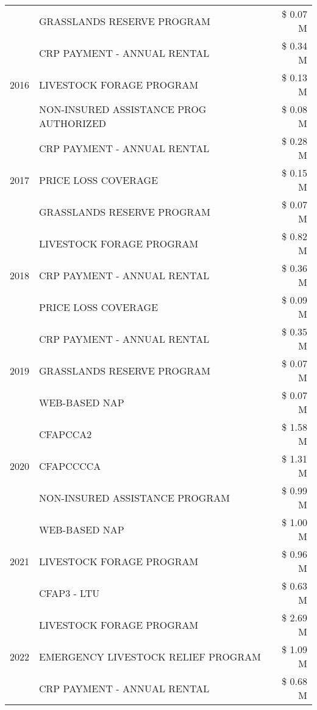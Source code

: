 \begin{tabular}{llr}
 & GRASSLANDS RESERVE PROGRAM & \$ 0.07 M \\
\cline{1-3}
\multirow[t]{3}{*}{2016} & CRP PAYMENT - ANNUAL RENTAL & \$ 0.34 M \\
 & LIVESTOCK FORAGE PROGRAM & \$ 0.13 M \\
 & NON-INSURED ASSISTANCE PROG AUTHORIZED & \$ 0.08 M \\
\cline{1-3}
\multirow[t]{3}{*}{2017} & CRP PAYMENT - ANNUAL RENTAL & \$ 0.28 M \\
 & PRICE LOSS COVERAGE & \$ 0.15 M \\
 & GRASSLANDS RESERVE PROGRAM & \$ 0.07 M \\
\cline{1-3}
\multirow[t]{3}{*}{2018} & LIVESTOCK FORAGE PROGRAM & \$ 0.82 M \\
 & CRP PAYMENT - ANNUAL RENTAL & \$ 0.36 M \\
 & PRICE LOSS COVERAGE & \$ 0.09 M \\
\cline{1-3}
\multirow[t]{3}{*}{2019} & CRP PAYMENT - ANNUAL RENTAL & \$ 0.35 M \\
 & GRASSLANDS RESERVE PROGRAM & \$ 0.07 M \\
 & WEB-BASED NAP & \$ 0.07 M \\
\cline{1-3}
\multirow[t]{3}{*}{2020} & CFAPCCA2 & \$ 1.58 M \\
 & CFAPCCCCA & \$ 1.31 M \\
 & NON-INSURED ASSISTANCE PROGRAM & \$ 0.99 M \\
\cline{1-3}
\multirow[t]{3}{*}{2021} & WEB-BASED NAP & \$ 1.00 M \\
 & LIVESTOCK FORAGE PROGRAM & \$ 0.96 M \\
 & CFAP3 - LTU & \$ 0.63 M \\
\cline{1-3}
\multirow[t]{3}{*}{2022} & LIVESTOCK FORAGE PROGRAM & \$ 2.69 M \\
 & EMERGENCY LIVESTOCK RELIEF PROGRAM & \$ 1.09 M \\
 & CRP PAYMENT - ANNUAL RENTAL & \$ 0.68 M \\
\cline{1-3}
\bottomrule
\end{tabular}
